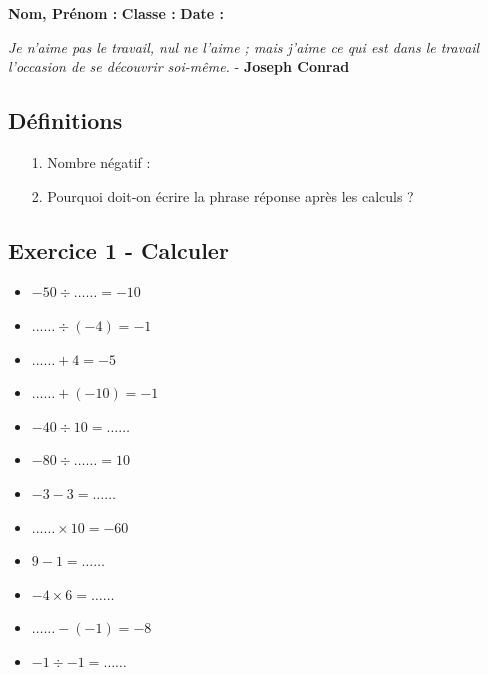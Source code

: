 



\textbf{Nom, Prénom :} \hspace{8cm} \textbf{Classe :} \hspace{3cm} \textbf{Date :}\\
\vspace{-0.8cm}
\begin{center}
  \textit{Je n'aime pas le travail, nul ne l'aime ; mais j'aime ce qui est dans le travail l'occasion de se découvrir soi-même.}  - \textbf{Joseph Conrad}
\end{center}
\vspace{-0.8cm}

\subsection*{Définitions}
  \begin{enumerate}
    \item[1.] Nombre négatif : \dotfill \\
    \Pointilles[1]
    \item[2.] Pourquoi doit-on écrire la phrase réponse après les calculs ?  \dotfill \\
    \Pointilles[2]
  \end{enumerate}

\subsection*{Exercice 1 - Calculer}

\begin{multicols}{3}\noindent
  \begin{itemize}[label={$\bullet$}]
        \item $-50 \div \ldots\ldots = -10$
        \item $\ldots\ldots \div \left( -4\right) = -1$
        \item $\ldots\ldots + 4 = -5$
        \item $\ldots\ldots + \left( -10\right) = -1$
        \item $-40 \div 10 = \ldots\ldots$
        \item $-80 \div \ldots\ldots = 10$
        \item $-3 - 3 = \ldots\ldots$
        \item $\ldots\ldots \times 10 = -60$
        \item $9 - 1 = \ldots\ldots$
        \item $-4 \times 6 = \ldots\ldots$
        \item $\ldots\ldots - \left( -1\right) = -8$
        \item $-1 \div -1 = \ldots\ldots$
    \end{itemize}
  \end{multicols}

